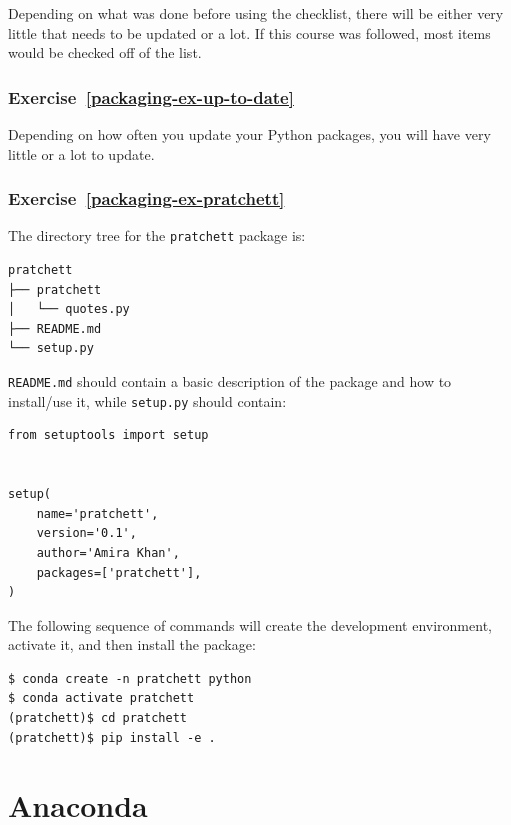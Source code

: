 \documentclass[
]{krantz}
\begin{document}
Depending on what was done before using the checklist, there will be either
very little that needs to be updated or a lot. If this course was followed,
most items would be checked off of the list.

\hypertarget{exercise-refpackaging-ex-up-to-date}{%
\subsection*{Exercise~\ref{packaging-ex-up-to-date}}\label{exercise-refpackaging-ex-up-to-date}}


Depending on how often you update your Python packages, you will have very little
or a lot to update.

\hypertarget{exercise-refpackaging-ex-pratchett}{%
\subsection*{Exercise~\ref{packaging-ex-pratchett}}\label{exercise-refpackaging-ex-pratchett}}


The directory tree for the \texttt{pratchett} package is:

\begin{verbatim}
pratchett
├── pratchett
│   └── quotes.py
├── README.md
└── setup.py
\end{verbatim}

\texttt{README.md} should contain a basic description of the package and how to install/use it,
while \texttt{setup.py} should contain:

\begin{verbatim}
from setuptools import setup


setup(
    name='pratchett',
    version='0.1',
    author='Amira Khan',
    packages=['pratchett'],
)
\end{verbatim}

The following sequence of commands will create the development environment,
activate it,
and then install the package:

\begin{verbatim}
$ conda create -n pratchett python
$ conda activate pratchett
(pratchett)$ cd pratchett
(pratchett)$ pip install -e .
\end{verbatim}

\hypertarget{anaconda}{%
\chapter{Anaconda}\label{anaconda}}
\end{document}

